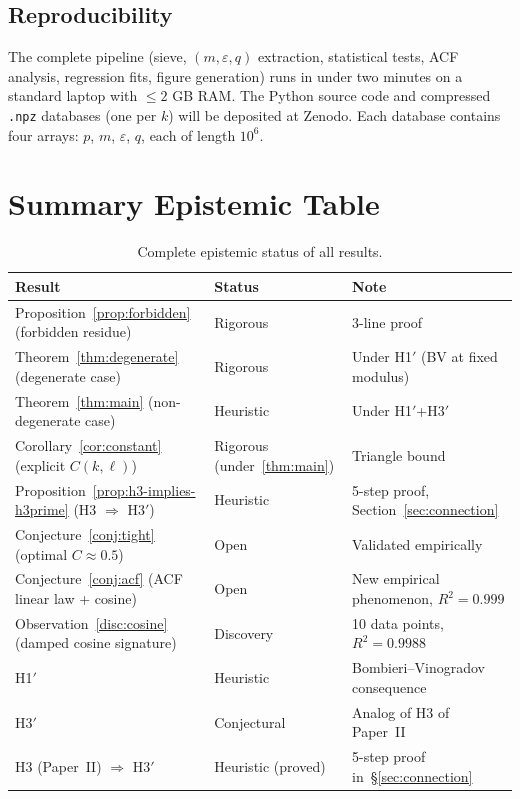 \documentclass[11pt,a4paper]{article}
\theoremstyle{plain}
\theoremstyle{definition}
\newcommand{\eps}{\varepsilon}
\begin{document}
\subsection{Reproducibility}

The complete pipeline (sieve, $(m, \eps, q)$ extraction, statistical tests,
ACF analysis, regression fits, figure generation) runs in under two minutes
on a standard laptop with $\le 2$ GB RAM. The Python source code and
compressed \texttt{.npz} databases (one per $k$) will be deposited at Zenodo.
Each database contains four arrays: $p$, $m$, $\eps$, $q$, each of length
$10^6$.

\section{Summary Epistemic Table}
\label{sec:epistemic}

\begin{table}[h!]
\centering
\caption{Complete epistemic status of all results.}
\begin{tabular}{l l p{5.5cm}}
\toprule
Result & Status & Note \\
\midrule
Proposition~\ref{prop:forbidden} (forbidden residue) & Rigorous & 3-line proof \\
Theorem~\ref{thm:degenerate} (degenerate case) & Rigorous & Under H1$'$ (BV at fixed modulus) \\
Theorem~\ref{thm:main} (non-degenerate case) & Heuristic & Under H1$'$+H3$'$ \\
Corollary~\ref{cor:constant} (explicit $C(k, \ell)$) & Rigorous (under~\ref{thm:main}) & Triangle bound \\
Proposition~\ref{prop:h3-implies-h3prime} (H3 $\Rightarrow$ H3$'$) & Heuristic & 5-step proof, Section~\ref{sec:connection} \\
Conjecture~\ref{conj:tight} (optimal $C \approx 0.5$) & Open & Validated empirically \\
Conjecture~\ref{conj:acf} (ACF linear law + cosine) & Open & New empirical phenomenon, $R^2 = 0.999$ \\
Observation~\ref{disc:cosine} (damped cosine signature) & Discovery & 10 data points, $R^2 = 0.9988$ \\
H1$'$ & Heuristic & Bombieri--Vinogradov consequence \\
H3$'$ & Conjectural & Analog of H3 of Paper~II \\
H3 (Paper~II) $\Rightarrow$ H3$'$ & Heuristic (proved) & 5-step proof in~\S\ref{sec:connection} \\
\bottomrule
\end{tabular}
\end{table}
\end{document}

